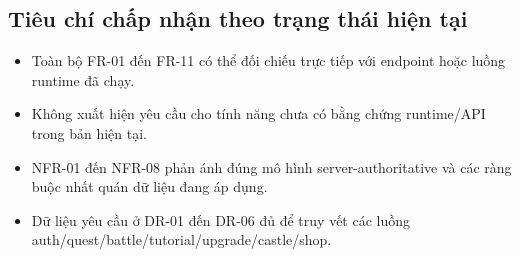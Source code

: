 \subsection{Tiêu chí chấp nhận theo trạng thái hiện tại}
\label{subsec:req-acceptance}

\begin{itemize}
    \item Toàn bộ FR-01 đến FR-11 có thể đối chiếu trực tiếp với endpoint hoặc luồng runtime đã chạy.
    \item Không xuất hiện yêu cầu cho tính năng chưa có bằng chứng runtime/API trong bản hiện tại.
    \item NFR-01 đến NFR-08 phản ánh đúng mô hình server-authoritative và các ràng buộc nhất quán dữ liệu đang áp dụng.
    \item Dữ liệu yêu cầu ở DR-01 đến DR-06 đủ để truy vết các luồng auth/\allowbreak quest/\allowbreak battle/\allowbreak tutorial/\allowbreak upgrade/\allowbreak castle/\allowbreak shop.
\end{itemize}
